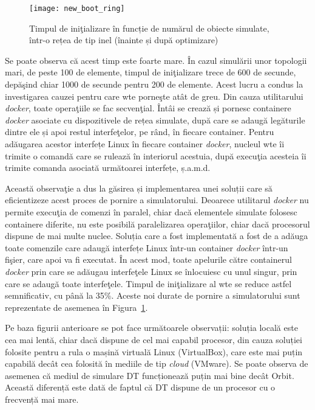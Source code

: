 \begin{figure}[h]
	\centering
	\texttt{[image: new\_boot\_ring]}
	\caption{Timpul de iniţializare în funcție de numărul de obiecte simulate, într-o rețea de tip inel (înainte și după optimizare)}
	\label{fig:new_boot_ring}
\end{figure}

Se poate observa că acest timp este foarte mare. În cazul simulării unor topologii mari, de peste 100 de elemente, timpul de iniţializare trece de 600 de secunde, depăşind chiar 1000 de secunde pentru 200 de elemente. Acest lucru a condus la investigarea cauzei pentru care \gls{wte} porneşte atât de greu. Din cauza utilitarului \textit{docker}, toate operaţiile se fac secvenţial. Întâi se crează și pornesc containere \textit{docker} asociate cu dispozitivele de rețea simulate, după care se adaugă legăturile dintre ele și apoi restul interfeţelor, pe rând, în fiecare container. Pentru adăugarea acestor interfețe Linux în fiecare container \textit{docker}, nucleul \gls{wte} îi trimite o comandă care se rulează în interiorul acestuia, după execuţia acesteia îi trimite comanda asociată următoarei interfețe, ș.a.m.d.

Această observaţie a dus la găsirea și implementarea unei soluții care să eficientizeze acest proces de pornire a simulatorului. Deoarece utilitarul \textit{docker} nu permite execuţia de comenzi în paralel, chiar dacă elementele simulate folosesc containere diferite, nu este posibilă paralelizarea operaţiilor, chiar dacă procesorul dispune de mai multe nuclee. Soluția care a fost implementată a fost de a adăuga toate comenzile care adaugă interfețe Linux într-un container \textit{docker} într-un fişier, care apoi va fi executat. În acest mod, toate apelurile către containerul \textit{docker} prin care se adăugau interfeţele Linux se înlocuiesc cu unul singur, prin care se adaugă toate interfeţele. Timpul de iniţializare al \gls{wte} se reduce astfel semnificativ, cu până la 35\%. Aceste noi durate de pornire a simulatorului sunt reprezentate de asemenea în Figura~\ref{fig:new_boot_ring}.

Pe baza figurii anterioare se pot face următoarele observații: soluția locală este cea mai lentă, chiar dacă dispune de cel mai capabil procesor, din cauza soluției folosite pentru a rula o mașină virtuală Linux (VirtualBox), care este mai puțin capabilă decât cea folosită în mediile de tip \textit{cloud} (VMware). Se poate observa de asemenea că mediul de simulare DT funcționează puțin mai bine decât Orbit. Această diferență este dată de faptul că DT dispune de un procesor cu o frecvență mai mare.

